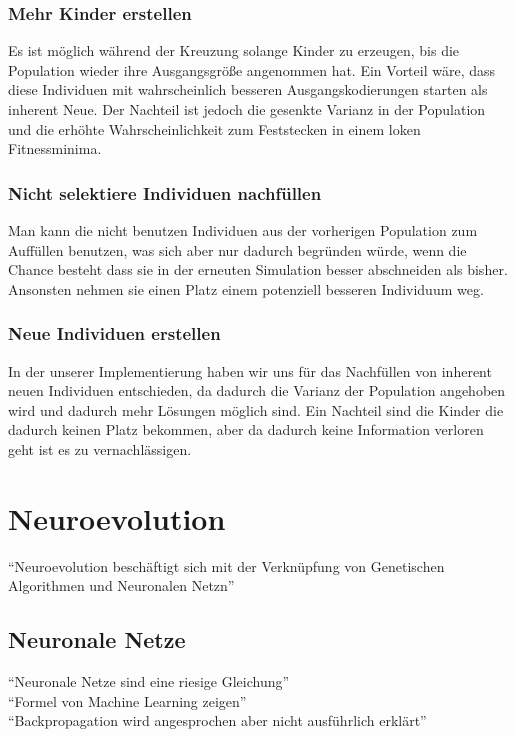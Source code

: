             \subsubsection*{Mehr Kinder erstellen}
                Es ist möglich während der Kreuzung solange Kinder zu erzeugen, bis die Population wieder ihre Ausgangsgröße angenommen hat. Ein Vorteil wäre, dass diese Individuen mit wahrscheinlich besseren Ausgangskodierungen starten als inherent Neue. Der Nachteil ist jedoch die gesenkte Varianz in der Population und die erhöhte Wahrscheinlichkeit zum Feststecken in einem loken Fitnessminima.

            \subsubsection*{Nicht selektiere Individuen nachfüllen}
                Man kann die nicht benutzen Individuen aus der vorherigen Population zum Auffüllen benutzen, was sich aber nur dadurch begründen würde, wenn die Chance besteht dass sie in der erneuten Simulation besser abschneiden als bisher. Ansonsten nehmen sie einen Platz einem potenziell besseren Individuum weg.

            \subsubsection*{Neue Individuen erstellen}
                In der unserer Implementierung haben wir uns für das Nachfüllen von inherent neuen Individuen entschieden, da dadurch die Varianz der Population angehoben wird und dadurch mehr Lösungen möglich sind. Ein Nachteil sind die Kinder die dadurch keinen Platz bekommen, aber da dadurch keine Information verloren geht ist es zu vernachlässigen.


    \section{Neuroevolution}
        ``Neuroevolution beschäftigt sich mit der Verknüpfung von Genetischen Algorithmen und Neuronalen Netzn''
        \subsection{Neuronale Netze}
                ``Neuronale Netze sind eine riesige Gleichung''\\
                ``Formel von Machine Learning zeigen'' \\
                ``Backpropagation wird angesprochen aber nicht ausführlich erklärt''\\
